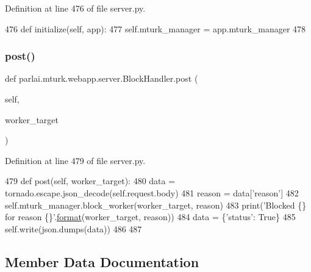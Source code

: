 Definition at line 476 of file server.\+py.


\begin{DoxyCode}
476     \textcolor{keyword}{def }initialize(self, app):
477         self.mturk\_manager = app.mturk\_manager
478 
\end{DoxyCode}
\mbox{\label{classparlai_1_1mturk_1_1webapp_1_1server_1_1BlockHandler_a8c9de27cced3819aaec3909b50d3b550}} 
\subsubsection{\texorpdfstring{post()}{post()}}
{\footnotesize\ttfamily def parlai.\+mturk.\+webapp.\+server.\+Block\+Handler.\+post (\begin{DoxyParamCaption}\item[{}]{self,  }\item[{}]{worker\+\_\+target }\end{DoxyParamCaption})}



Definition at line 479 of file server.\+py.


\begin{DoxyCode}
479     \textcolor{keyword}{def }post(self, worker\_target):
480         data = tornado.escape.json\_decode(self.request.body)
481         reason = data[\textcolor{stringliteral}{'reason'}]
482         self.mturk\_manager.block\_worker(worker\_target, reason)
483         print(\textcolor{stringliteral}{'Blocked \{\} for reason \{\}'}.\hyperlink{namespaceparlai_1_1chat__service_1_1services_1_1messenger_1_1shared__utils_a32e2e2022b824fbaf80c747160b52a76}{format}(worker\_target, reason))
484         data = \{\textcolor{stringliteral}{'status'}: \textcolor{keyword}{True}\}
485         self.write(json.dumps(data))
486 
487 
\end{DoxyCode}


\subsection{Member Data Documentation}
\mbox{\label{classparlai_1_1mturk_1_1webapp_1_1server_1_1BlockHandler_a478088460fbd6c910d6ca6bcb01b7016}} 
